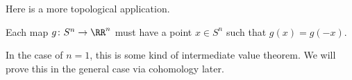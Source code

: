 \documentclass[../notes.tex]{subfiles}
\begin{document}
Here is a more topological application.
\begin{corollary}
	Each map $g\colon S^n\to\RR^n$ must have a point $x\in S^n$ such that $g(x)=g(-x)$.
\end{corollary}
In the case of $n=1$, this is some kind of intermediate value theorem. We will prove this in the general case via cohomology later.
\end{document}
